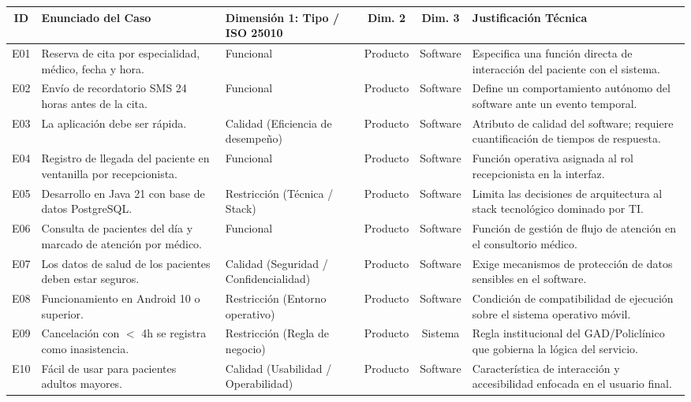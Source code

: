 \documentclass[conference]{IEEEtran}
\begin{document}
	\begin{center}
		\centering
		\scriptsize
		\setlength{\tabcolsep}{3pt}
		\begin{tabularx}{\textwidth}{@{}c Y p{3.2cm} c c Y@{}}
			\toprule
			\textbf{ID} & \textbf{Enunciado del Caso} & \textbf{Dimensi\'on 1: Tipo / ISO 25010} & \textbf{Dim. 2} & \textbf{Dim. 3} & \textbf{Justificaci\'on T\'ecnica}\\
			\midrule
			E01 & Reserva de cita por especialidad, m\'edico, fecha y hora. & Funcional & Producto & Software & Especifica una funci\'on directa de interacci\'on del paciente con el sistema.\\
			E02 & Env\'io de recordatorio SMS 24 horas antes de la cita. & Funcional & Producto & Software & Define un comportamiento aut\'onomo del software ante un evento temporal.\\
			E03 & La aplicaci\'on debe ser r\'apida. & Calidad (Eficiencia de desempe\~no) & Producto & Software & Atributo de calidad del software; requiere cuantificaci\'on de tiempos de respuesta.\\
			E04 & Registro de llegada del paciente en ventanilla por recepcionista. & Funcional & Producto & Software & Funci\'on operativa asignada al rol recepcionista en la interfaz.\\
			E05 & Desarrollo en Java 21 con base de datos PostgreSQL. & Restricci\'on (T\'ecnica / Stack) & Producto & Software & Limita las decisiones de arquitectura al stack tecnol\'ogico dominado por TI.\\
			E06 & Consulta de pacientes del d\'ia y marcado de atenci\'on por m\'edico. & Funcional & Producto & Software & Funci\'on de gesti\'on de flujo de atenci\'on en el consultorio m\'edico.\\
			E07 & Los datos de salud de los pacientes deben estar seguros. & Calidad (Seguridad / Confidencialidad) & Producto & Software & Exige mecanismos de protecci\'on de datos sensibles en el software.\\
			E08 & Funcionamiento en Android 10 o superior. & Restricci\'on (Entorno operativo) & Producto & Software & Condici\'on de compatibilidad de ejecuci\'on sobre el sistema operativo m\'ovil.\\
			E09 & Cancelaci\'on con $<$ 4h se registra como inasistencia. & Restricci\'on (Regla de negocio) & Producto & Sistema & Regla institucional del GAD/Policl\'inico que gobierna la l\'ogica del servicio.\\
			E10 & F\'acil de usar para pacientes adultos mayores. & Calidad (Usabilidad / Operabilidad) & Producto & Software & Caracter\'istica de interacci\'on y accesibilidad enfocada en el usuario final.\\

\end{tabularx}
\end{center}
\end{document}
